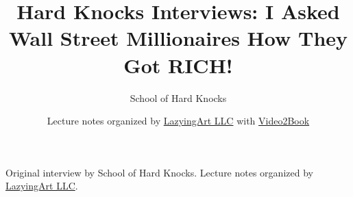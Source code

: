 \documentclass[11pt,oneside]{book}
\begin{document}
\frontmatter
\title{Hard Knocks Interviews: I Asked Wall Street Millionaires How They Got RICH!}
\author{School of Hard Knocks}
\date{Lecture notes organized by \href{https://lazying.art}{LazyingArt LLC} with \href{https://github.com/lachlanchen/Video2Book}{Video2Book}}
\maketitle
\begin{center}
\small Original interview by School of Hard Knocks. Lecture notes organized by \href{https://lazying.art}{LazyingArt LLC}.
\end{center}
\clearpage
\mainmatter

\end{document}
